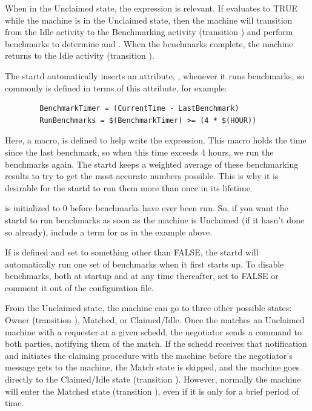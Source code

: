When in the Unclaimed state,
the  \label{param:RunBenchmarks}  
expression is relevant.
If  evaluates to TRUE while the machine
is in the Unclaimed state,
then the machine will transition from the Idle
activity to the Benchmarking activity (transition ) and
perform benchmarks to determine  and .  
When the benchmarks complete, the machine returns to the Idle activity
(transition ).

The startd automatically inserts an attribute, ,
whenever it runs benchmarks, so commonly  is
defined in terms of this attribute, for example:
\begin{verbatim}
        BenchmarkTimer = (CurrentTime - LastBenchmark)
        RunBenchmarks = $(BenchmarkTimer) >= (4 * $(HOUR))
\end{verbatim}
Here, a macro,  is defined to help write the
expression.
This macro holds the time since the last benchmark,
so when this time exceeds 4 hours, we run the benchmarks again.
The startd keeps a weighted average of these benchmarking
results to try to get the most accurate numbers possible.
This is why
it is desirable for 
the startd to run them more than once in its lifetime.

\Note {} is initialized to 0 before benchmarks
have ever been run.
So, if you want the startd to run benchmarks as soon as the machine is
Unclaimed (if it hasn't done so already),
include a term for  as in the example above.

\Note If  is defined and set to something
other than FALSE, the startd will automatically run one set of
benchmarks when it first starts up.
To disable benchmarks, both at startup and at any time thereafter,
set  to FALSE or comment it out of the
configuration file.

From the Unclaimed state, the machine can go to three other possible
states: Owner (transition ), Matched, or Claimed/Idle.
Once the  matches an Unclaimed machine with a
requester at a given schedd, the negotiator sends a command to both
parties, notifying them of the match.  
If the schedd receives that notification and initiates the claiming
procedure with the machine before the negotiator's message gets to the
machine, the Match state is skipped,
and the machine goes
directly to the Claimed/Idle state (transition ).
However, normally the machine will enter the Matched state (transition
), even if it is only for a brief period of time.

